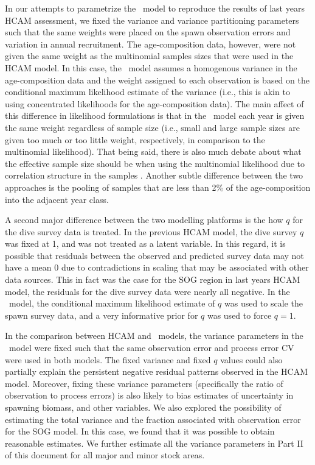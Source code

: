 In our attempts to parametrize the \iscam\ model to reproduce the results of last years HCAM assessment, we fixed the variance and variance partitioning parameters such that the same weights were placed on the spawn observation errors and variation in annual recruitment. The age-composition data, however, were not given the same weight as the multinomial samples sizes that were used in the HCAM model. In this case, the \iscam\ model assumes a homogenous variance in the age-composition data and the weight assigned to each observation is based on the conditional maximum likelihood estimate of the variance (i.e., this is akin to using concentrated likelihoods for the age-composition data).  The main affect of this difference in likelihood formulations is that in the \iscam\ model each year is given the same weight regardless of sample size (i.e., small and large sample sizes are given too much or too little weight, respectively, in comparison to the multinomial likelihood).  That being said, there is also much debate about what the effective sample size should be when using the multinomial likelihood due to correlation structure in the samples \citep[e.g.,][]{francis2011data}.  Another subtle difference between the two approaches is the pooling of samples that are less than 2\% of the age-composition into the adjacent year class.


A second major difference between the two modelling platforms is the how $q$ for the dive survey data is treated.  In the previous HCAM model, the dive survey $q$ was fixed at 1, and was not treated as a latent variable.  In this regard, it is possible that residuals between the observed and predicted survey data may not have a mean 0 due to contradictions in scaling that may be associated with other data sources. This in fact was the case for the SOG region in last years HCAM model, the residuals for the dive survey data were nearly all negative.  In the \iscam\ model, the conditional maximum likelihood estimate of $q$ was used to scale the spawn survey data, and a very informative prior for $q$ was used to force $q=1$.

In the comparison between HCAM and  \iscam\ models, the variance parameters in the \iscam\ model were fixed such that the same observation error and process error CV were used in both models.  The fixed variance and fixed $q$ values could also partially explain the persistent negative residual patterns observed in the HCAM model.  Moreover, fixing these variance parameters  (specifically the ratio of observation to process errors) is also likely to bias estimates of uncertainty in spawning biomass, and other variables.  We also explored the possibility of estimating the total variance and the fraction associated with observation error for the SOG model.  In this case, we found that it was possible to obtain reasonable estimates.  We further estimate all the variance parameters in Part II of this document for all major and minor stock areas.

